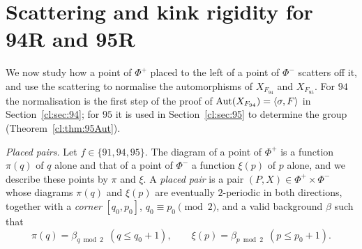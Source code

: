 \section{Scattering and kink rigidity for 94R and 95R}\label{cl:sec:scatter}

We now study how a point of $\Phi^+$ placed to the left of a point of $\Phi^-$ scatters off it, and use the scattering to normalise the automorphisms of $X_{F_{94}}$ and $X_{F_{95}}$. For $94$ the normalisation is the first step of the proof of $\operatorname{Aut}(X_{F_{94}})=\langle\sigma,F\rangle$ in Section~\ref{cl:sec:94}; for $95$ it is used in Section~\ref{cl:sec:95} to determine the group (Theorem~\ref{cl:thm:95Aut}).

\emph{Placed pairs.} Let $f\in\{91,94,95\}$. The diagram of a point of $\Phi^+$ is a function $\pi(q)$ of $q$ alone and that of a point of $\Phi^-$ a function $\xi(p)$ of $p$ alone, and we describe these points by $\pi$ and $\xi$. A \emph{placed pair} is a pair $(P,X)\in\Phi^+\times\Phi^-$ whose diagrams $\pi(q)$ and $\xi(p)$ are eventually $2$-periodic in both directions, together with a \emph{corner} $[q_0,p_0]$, $q_0\equiv p_0\pmod2$, and a valid background $\beta$ such that
\[
\pi(q)=\beta_{q\bmod2}\ \ (q\le q_0+1),\qquad \xi(p)=\beta_{p\bmod2}\ \ (p\le p_0+1).
\]
